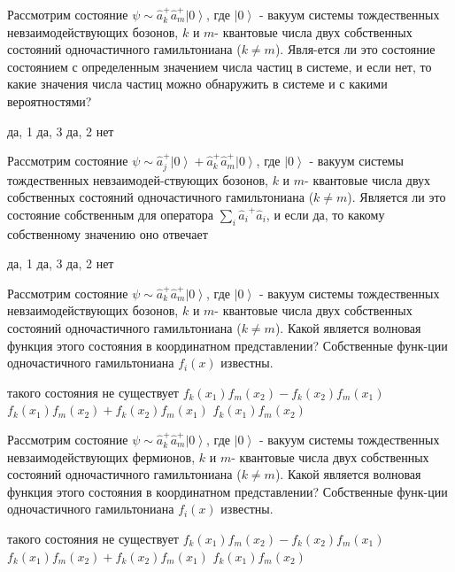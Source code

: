\documentclass[11pt,a4paper]{exam}
\begin{document}
\begin{questions}
\question Рассмотрим состояние $\psi  \sim \hat a_k^ + \hat a_m^ + \left| 0 \right\rangle $, где $\left| 0 \right\rangle $ - вакуум системы тождественных невзаимодействующих бозонов, $k$ и $m$- квантовые числа двух собственных состояний одночастичного гамильтониана ($k \ne m$). Явля-ется ли это состояние состоянием с определенным значением числа частиц в системе, и если нет, то какие значения числа частиц можно обнаружить в системе и с какими вероятностями?
\begin{choices}
\choice да, 1             
\choice да, 3
\choice да, 2          
\choice нет
\end{choices}

\question Рассмотрим состояние $\psi  \sim \hat a_j^ + \left| 0 \right\rangle  + \hat a_k^ + \hat a_m^ + \left| 0 \right\rangle $, где $\left| 0 \right\rangle $ - вакуум системы тождественных невзаимодей-ствующих бозонов, $k$ и $m$- квантовые числа двух собственных состояний одночастичного гамильтониана ($k \ne m$). Является ли это состояние собственным для оператора $\sum\limits_i {{{\hat a}_i}^ + {{\hat a}_i}} $, и если да, то какому собственному значению оно отвечает
\begin{choices}
\choice да, 1             
\choice да, 3
\choice да, 2          
\choice нет
\end{choices}

\question Рассмотрим состояние $\psi  \sim \hat a_k^ + \hat a_m^ + \left| 0 \right\rangle $, где $\left| 0 \right\rangle $ - вакуум системы тождественных невзаимодействующих бозонов, $k$ и $m$- квантовые числа двух собственных состояний одночастичного гамильтониана ($k \ne m$). Какой является волновая функция этого состояния в координатном представлении? Собственные функ-ции одночастичного гамильтониана ${f_i}(x)$ известны.
\begin{choices}
\choice такого состояния не существует      
\choice ${f_k}({x_1}){f_m}({x_2}) - {f_k}({x_2}){f_m}({x_1})$
\choice ${f_k}({x_1}){f_m}({x_2}) + {f_k}({x_2}){f_m}({x_1})$     
\choice ${f_k}({x_1}){f_m}({x_2})$
\end{choices}

\question Рассмотрим состояние $\psi  \sim \hat a_k^ + \hat a_m^ + \left| 0 \right\rangle $, где $\left| 0 \right\rangle $ - вакуум системы тождественных невзаимодействующих фермионов, $k$ и $m$- квантовые числа двух собственных состояний одночастичного гамильтониана ($k \ne m$). Какой является волновая функция этого состояния в координатном представлении? Собственные функ-ции одночастичного гамильтониана ${f_i}(x)$ известны.
\begin{choices}
\choice такого состояния не существует      
\choice ${f_k}({x_1}){f_m}({x_2}) - {f_k}({x_2}){f_m}({x_1})$
\choice ${f_k}({x_1}){f_m}({x_2}) + {f_k}({x_2}){f_m}({x_1})$     
\choice ${f_k}({x_1}){f_m}({x_2})$
\end{choices}


\end{questions}
\end{document}
